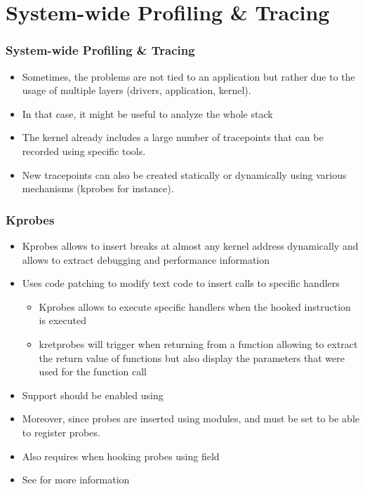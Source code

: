 \section{System-wide Profiling \& Tracing}

\begin{frame}
  \frametitle{System-wide Profiling \& Tracing}
  \begin{itemize}
    \item Sometimes, the problems are not tied to an application but rather
          due to the usage of multiple layers (drivers, application, kernel).
    \item In that case, it might be useful to analyze the whole stack
    \item The kernel already includes a large number of tracepoints that can be
          recorded using specific tools.
    \item New tracepoints can also be created statically or dynamically using
          various mechanisms (kprobes for instance).
  \end{itemize}
\end{frame}

\begin{frame}[fragile]
  \frametitle{Kprobes}
  \begin{itemize}
    \item {Kprobes} allows to insert breaks at almost any kernel address
          dynamically and allows to extract debugging and performance
          information
    \item Uses code patching to modify text code to insert calls to specific
          handlers
    \begin{itemize}
      \item Kprobes allows to execute specific handlers when the hooked
            instruction is executed
      \item kretprobes will trigger when returning from a function allowing to
            extract the return value of functions but also display the
            parameters that were used for the function call
    \end{itemize}
    \item Support should be enabled using 
    \item Moreover, since probes are inserted using modules, 
    and  must be set to be able to
    register probes.
    \item Also requires  when hooking probes
          using  field
    \item See  for more information
  \end{itemize}
\end{frame}

